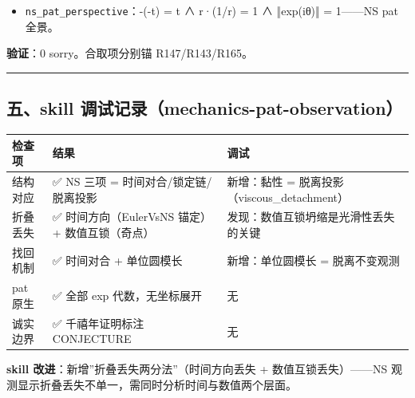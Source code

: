 \documentclass[
]{article}
\newcounter{none} %
\providecommand{\tightlist}{%
 \setlength{\itemsep}{0pt}\setlength{\parskip}{0pt}}
\begin{document}
\begin{itemize}
\tightlist
\item
 \texttt{ns\_pat\_perspective}：-(-t) = t ∧ r·(1/r) = 1 ∧ ‖exp(iθ)‖ =
 1------NS pat 全景。
\end{itemize}

\textbf{验证}：0 sorry。合取项分别锚 R147/R143/R165。

\begin{center}\rule{0.5\linewidth}{0.5pt}\end{center}

\subsection{五、skill
调试记录（mechanics-pat-observation）}\label{ux4e94skill-ux8c03ux8bd5ux8bb0ux5f55mechanics-pat-observation}

{\def\LTcaptype{none} %
\begin{longtable}[]{@{}
 >{\raggedright\arraybackslash}p{}
 >{\raggedright\arraybackslash}p{}
 >{\raggedright\arraybackslash}p{}@{}}
\toprule\noalign{}
\begin{minipage}[b]{\linewidth}\raggedright
检查项
\end{minipage} & \begin{minipage}[b]{\linewidth}\raggedright
结果
\end{minipage} & \begin{minipage}[b]{\linewidth}\raggedright
调试
\end{minipage} \\
\midrule\noalign{}
\endhead
\bottomrule\noalign{}
\endlastfoot
结构对应 & ✅ NS 三项 = 时间对合/锁定链/脱离投影 & 新增：黏性 =
脱离投影（viscous\_detachment） \\
折叠丢失 & ✅ 时间方向（EulerVsNS 锚定）+ 数值互锁（奇点） &
发现：数值互锁坍缩是光滑性丢失的关键 \\
找回机制 & ✅ 时间对合 + 单位圆模长 & 新增：单位圆模长 = 脱离不变观测 \\
pat 原生 & ✅ 全部 exp 代数，无坐标展开 & 无 \\
诚实边界 & ✅ 千禧年证明标注 CONJECTURE & 无 \\
\end{longtable}
}

\textbf{skill 改进}：新增''折叠丢失两分法''（时间方向丢失 +
数值互锁丢失）------NS
观测显示折叠丢失不单一，需同时分析时间与数值两个层面。
\end{document}
